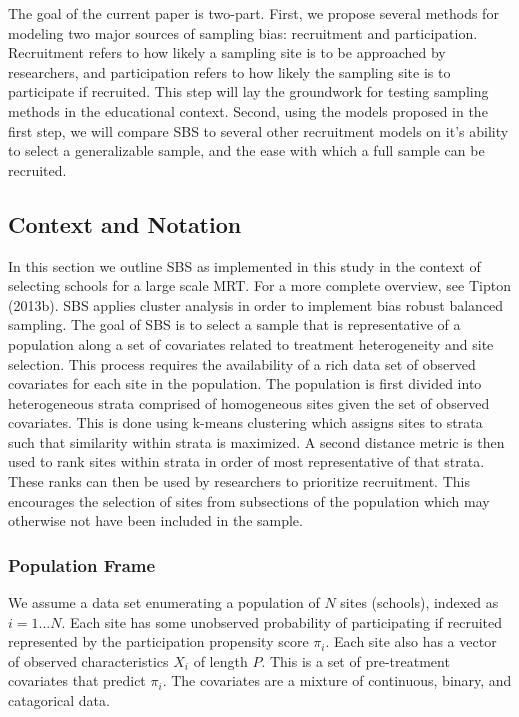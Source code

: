 \documentclass[man,floatsintext]{apa6}
\begin{document}
The goal of the current paper is two-part. First, we propose several methods for modeling two major sources of sampling bias: recruitment and participation. Recruitment refers to how likely a sampling site is to be approached by researchers, and participation refers to how likely the sampling site is to participate if recruited. This step will lay the groundwork for testing sampling methods in the educational context. Second, using the models proposed in the first step, we will compare SBS to several other recruitment models on it's ability to select a generalizable sample, and the ease with which a full sample can be recruited.

\hypertarget{context-and-notation}{%
\subsection{Context and Notation}\label{context-and-notation}}

In this section we outline SBS as implemented in this study in the context of selecting schools for a large scale MRT. For a more complete overview, see Tipton (2013b). SBS applies cluster analysis in order to implement bias robust balanced sampling. The goal of SBS is to select a sample that is representative of a population along a set of covariates related to treatment heterogeneity and site selection. This process requires the availability of a rich data set of observed covariates for each site in the population. The population is first divided into heterogeneous strata comprised of homogeneous sites given the set of observed covariates. This is done using k-means clustering which assigns sites to strata such that similarity within strata is maximized. A second distance metric is then used to rank sites within strata in order of most representative of that strata. These ranks can then be used by researchers to prioritize recruitment. This encourages the selection of sites from subsections of the population which may otherwise not have been included in the sample.

\hypertarget{population-frame}{%
\subsubsection{Population Frame}\label{population-frame}}

We assume a data set enumerating a population of \(N\) sites (schools), indexed as \(i = 1 ... N\). Each site has some unobserved probability of participating if recruited represented by the participation propensity score \(\pi_i\). Each site also has a vector of observed characteristics \(X_i\) of length \(P\). This is a set of pre-treatment covariates that predict \(\pi_i\). The covariates are a mixture of continuous, binary, and catagorical data.
\end{document}
